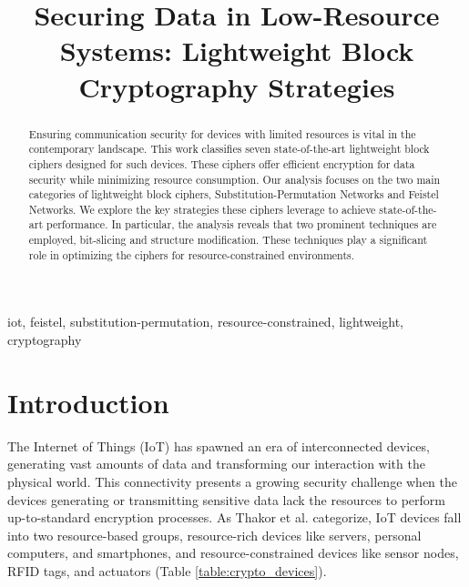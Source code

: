 \documentclass[conference]{IEEEtran}
\begin{document}
\title{Securing Data in Low-Resource Systems: Lightweight Block Cryptography Strategies}


\author{
\and
{}
}


\maketitle

\begin{abstract}
    Ensuring communication security for devices with limited resources is vital in the contemporary landscape. This work classifies seven state-of-the-art lightweight block ciphers designed for such devices. These ciphers offer efficient encryption for data security while minimizing resource consumption. Our analysis focuses on the two main categories of lightweight block ciphers, Substitution-Permutation Networks and Feistel Networks. We explore the key strategies these ciphers leverage to achieve state-of-the-art performance. In particular, the analysis reveals that two prominent techniques are employed, bit-slicing and structure modification. These techniques play a significant role in optimizing the ciphers for resource-constrained environments.
\end{abstract}

\begin{IEEEkeywords}
iot, feistel, substitution-permutation, resource-constrained, lightweight, cryptography
\end{IEEEkeywords}

\section{Introduction}

The Internet of Things (IoT) has spawned an era of interconnected devices, generating vast amounts of data and transforming our interaction with the physical world. This connectivity presents a growing security challenge when the devices generating or transmitting sensitive data lack the resources to perform up-to-standard encryption processes. As Thakor et al. \cite{IoT_1} categorize, IoT devices fall into two resource-based groups, resource-rich devices like servers, personal computers, and smartphones, and resource-constrained devices like sensor nodes, RFID tags, and actuators (Table \ref{table:crypto_devices}).
\end{document}
